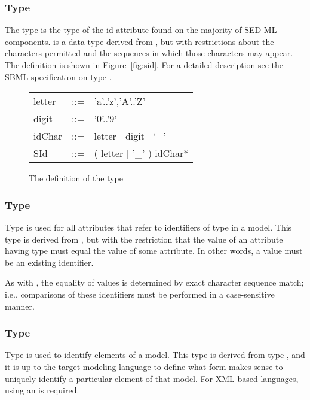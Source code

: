 \subsubsection[\element{SId}]{Type }
\label{type:sid}
The type  is the type of the id attribute found on the majority of SED-ML components.  is a data type derived from , but with restrictions about the characters permitted and the sequences in which those characters may appear. The definition is shown in Figure~\vref{fig:sid}. For a detailed description see the SBML specification on type  \citep{HBH+10}.

\begin{figure}[hbt]
  \ttfamily
  \small
  \centering
  \begin{tabular}{lll}
    letter & ::= & 'a'..'z','A'..'Z'\\
    digit  & ::= & '0'..'9'\\
    idChar & ::= & letter | digit | `\_'\\
    SId    & ::= & ( letter | '\_' ) idChar*\\
  \end{tabular}
  \vspace*{-1ex}
  \caption{The definition of the type }
  \label{fig:sid}
\end{figure}

\subsubsection[\SIdRef]{Type \SIdRef}
\label{type:sidref}
Type  is used for all attributes that refer to identifiers of type \SId in a model. This type is derived from \SId, but with the restriction that the value of an attribute having type  must equal the value of some \SId attribute. In other words, a  value must be an existing identifier.

As with \SId, the equality of  values is determined by exact character sequence match; i.e., comparisons of these identifiers must be performed in a case-sensitive manner.

\begin{blockChanged}
\subsubsection[\element{TargetType}]{Type }
\label{type:target}
Type  is used to identify elements of a model.  This type is derived from type , and it is up to the target modeling language to define what form makes sense to uniquely identify a particular element of that model.  For XML-based languages, using an  is required.
\end{blockChanged}

